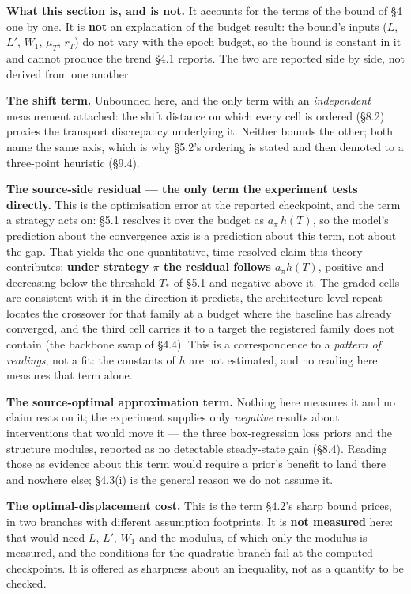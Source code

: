 \documentclass[pdflatex,sn-mathphys-ay]{sn-jnl}
\begin{document}
\textbf{What this section is, and is not.} It accounts for the terms of the bound of \S{}4 one by one. It is \textbf{not} an explanation of the budget result: the bound's inputs ($L$, $L'$, $W_1$, $\mu_T$, $r_T$) do not vary with the epoch budget, so the bound is constant in it and cannot produce the trend \S{}4.1 reports. The two are reported side by side, not derived from one another.

\textbf{The shift term.} Unbounded here, and the only term with an \emph{independent} measurement attached: the shift distance on which every cell is ordered (\S{}8.2) proxies the transport discrepancy underlying it. Neither bounds the other; both name the same axis, which is why \S{}5.2's ordering is stated and then demoted to a three-point heuristic (\S{}9.4).

\textbf{The source-side residual --- the only term the experiment tests directly.} This is the optimisation error at the reported checkpoint, and the term a strategy acts on: \S{}5.1 resolves it over the budget as $a_\pi\,h(T)$, so the model's prediction about the convergence axis is a prediction about this term, not about the gap. That yields the one quantitative, time-resolved claim this theory contributes: \textbf{under strategy $\pi$ the residual follows $a_\pi h(T)$}, positive and decreasing below the threshold $T_*$ of \S{}5.1 and negative above it. The graded cells are consistent with it in the direction it predicts, the architecture-level repeat locates the crossover for that family at a budget where the baseline has already converged, and the third cell carries it to a target the registered family does not contain (the backbone swap of \S{}4.4). This is a correspondence to a \emph{pattern of readings}, not a fit: the constants of $h$ are not estimated, and no reading here measures that term alone.

\textbf{The source-optimal approximation term.} Nothing here measures it and no claim rests on it; the experiment supplies only \emph{negative} results about interventions that would move it --- the three box-regression loss priors and the structure modules, reported as no detectable steady-state gain (\S{}8.4). Reading those as evidence about this term would require a prior's benefit to land there and nowhere else; \S{}4.3(i) is the general reason we do not assume it.

\textbf{The optimal-displacement cost.} This is the term \S{}4.2's sharp bound prices, in two branches with different assumption footprints. It is \textbf{not measured} here: that would need $L$, $L'$, $W_1$ and the modulus, of which only the modulus is measured, and the conditions for the quadratic branch fail at the computed checkpoints. It is offered as sharpness about an inequality, not as a quantity to be checked.
\end{document}
